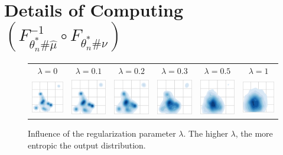 
\section{Details of Computing $(F_{\theta_{n}^*\#\hat{\mu}}^{-1} \circ F_{\theta^*_{n}\#\nu}) $}



\begin{figure}
\begin{centering}
\setlength\tabcolsep{1pt}
\begin{tabular}{cccccc}
$\lambda=0$ & $\lambda=0.1$ & $\lambda=0.2$ & $\lambda=0.3$ & $\lambda=0.5$ & $\lambda=1$\tabularnewline
\includegraphics[width=2cm]{figures/supplementary/regularization/r0_output_dist_k=70-crop.pdf} & \includegraphics[width=2cm]{figures/supplementary/regularization/r01_output_dist_k=70-crop.pdf} & \includegraphics[width=2cm]{figures/supplementary/regularization/r02_output_dist_k=70-crop.pdf} &  \includegraphics[width=2cm]{figures/supplementary/regularization/r03_output_dist_k=70-crop.pdf}&  \includegraphics[width=2cm]{figures/supplementary/regularization/r05_output_dist_k=70-crop.pdf} &  \includegraphics[width=2cm]{figures/supplementary/regularization/r1_output_dist_k=70-crop.pdf}
\end{tabular}
\par\end{centering}
\caption{Influence of the regularization parameter $\lambda$. The higher $\lambda$, the more entropic the output distribution.\label{fig:lambda_supp}}
\end{figure}
